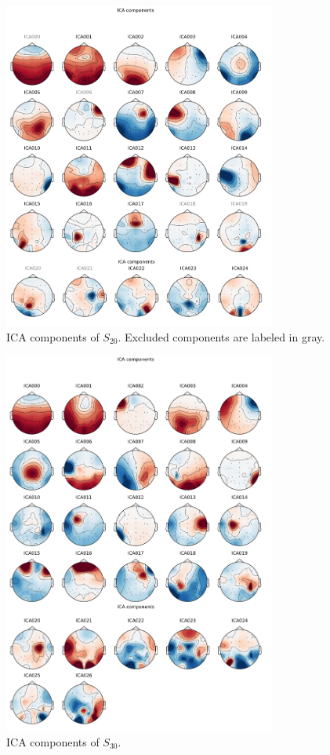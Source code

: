 \documentclass[a4paper]{article}
\begin{document}
\begin{figure}[tbh!] 
  \centering
     \includegraphics[width=0.8\textwidth]{ica20.png}
  \caption{ICA components of $S_{20}$. Excluded components are labeled in gray.}
  \label{fig:ica20}
\end{figure}

\begin{figure}[tbh!] 
  \centering
     \includegraphics[width=0.8\textwidth]{ica30.png}
  \caption{ICA components of $S_{30}$.}
  \label{fig:ica30}
\end{figure}
\end{document}

